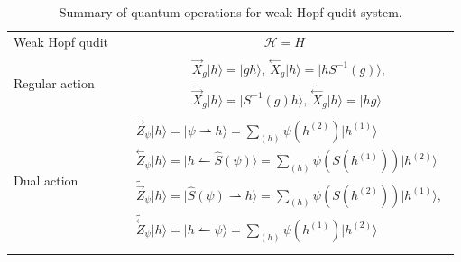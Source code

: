 \documentclass[a4paper,11pt]{article}
\theoremstyle{theorem}
\theoremstyle{remark}
\newcommand{\XR}{\overset{\rightarrow}{X}}
\newcommand{\XL}{\overset{\leftarrow}{X}}
\newcommand{\ZR}{\overset{\rightarrow}{Z}}
\newcommand{\ZL}{\overset{\leftarrow}{Z}}
\newcommand{\cone}{(1)}
\newcommand{\ctwo}{(2)}
\newcommand\Tr{\operatorname{Tr}}
\newcommand{\Irr}{\operatorname{Irr}}
\begin{document}
\begin{table}
    \centering
{
    \setlength{\tabcolsep}{3mm}
    \renewcommand{\arraystretch}{1.3} %
    \begin{tabular}{|l|c|}
    \hhline{|==|}
 Weak Hopf qudit &  $\mathcal{H}=H$   \\
    \hhline{|--|}
    Regular action  & $\begin{aligned}
    & \XR_g|h\rangle =|gh\rangle,\ \XL_g|h\rangle =|hS^{-1}(g)\rangle,  \\
    & \tilde{\XR}_g|h\rangle =|S^{-1}(g)h\rangle,\ \tilde{\XL}_g|h\rangle =|hg\rangle 
    \end{aligned}$   \\
    \hhline{|--|}
    Dual action  &  $\begin{aligned}
  &\ZR_{\psi}|h\rangle =|\psi \rightharpoonup h\rangle= \sum_{(h)}\psi(h^{\ctwo})|h^{\cone}\rangle\\
   &   \ZL_{\psi}|h\rangle=|h \leftharpoonup \hat{S}(\psi)\rangle = \sum_{(h)}\psi(S(h^{\cone}))|h^{\ctwo}\rangle\\
   &  \tilde{\ZR}_{\psi}|h\rangle =|\hat{S}(\psi) \rightharpoonup h\rangle= \sum_{(h)}\psi(S(h^{\ctwo}))|h^{\cone}\rangle,\\
    &  \tilde{\ZL}_{\psi}|h\rangle=|h \leftharpoonup \psi\rangle = \sum_{(h)}\psi(h^{\cone})|h^{\ctwo}\rangle
    \end{aligned}$ \\
    \hhline{|==|}
    \end{tabular} 
}
    \caption{Summary of quantum operations for weak Hopf qudit system.}
    \label{tab:HopfQudit}
\end{table}
\end{document}
